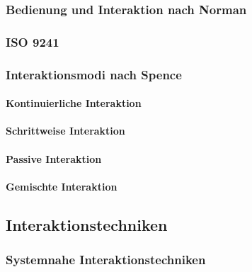             \subsubsection{Bedienung und Interaktion nach Norman} %

            \subsubsection{ISO 9241} %

            \subsubsection{Interaktionsmodi nach Spence} %

                \paragraph{Kontinuierliche Interaktion} %

                \paragraph{Schrittweise Interaktion} %

                \paragraph{Passive Interaktion} %

                \paragraph{Gemischte Interaktion} %

        \subsection{Interaktionstechniken} %

            \subsubsection{Systemnahe Interaktionstechniken} %

